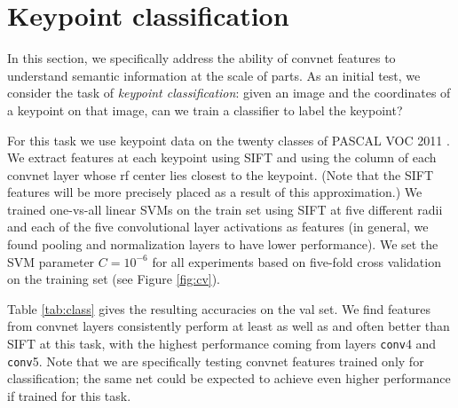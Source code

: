 \documentclass{article} %
\begin{document}
\section{Keypoint classification}

In this section, we specifically address the ability of convnet features to
understand semantic information at the scale of parts.
As an initial test, we consider the task of \emph{keypoint classification}:
given an image and the coordinates of a keypoint on that image, can we train a classifier to label
the keypoint?

For this task we use keypoint data \cite{BourdevMalikICCV09} on the twenty classes
of PASCAL VOC 2011 \cite{pascal}.
We extract features at each keypoint using SIFT \cite{SIFT} and using the column
of each convnet layer whose rf center lies closest to the keypoint. (Note that the
SIFT  features will be more precisely placed as a result of this approximation.)
We trained one-vs-all linear SVMs on the train set using SIFT at five different
radii and each of the five convolutional layer activations
as features (in general, we found pooling and normalization layers to have lower
performance).
We set the SVM parameter $C = 10^{-6}$ for all experiments based on five-fold cross validation on
the training set (see Figure \ref{fig:cv}).

Table \ref{tab:class} gives the resulting accuracies on the val set.
We find features from convnet layers consistently perform at least as well as
and often better than SIFT at this task, with the highest performance coming
from layers \texttt{conv}4 and \texttt{conv}5. 
Note that we are specifically testing convnet features trained only for
classification; the same net could be expected to achieve even higher performance
if trained for this task.
\end{document}
